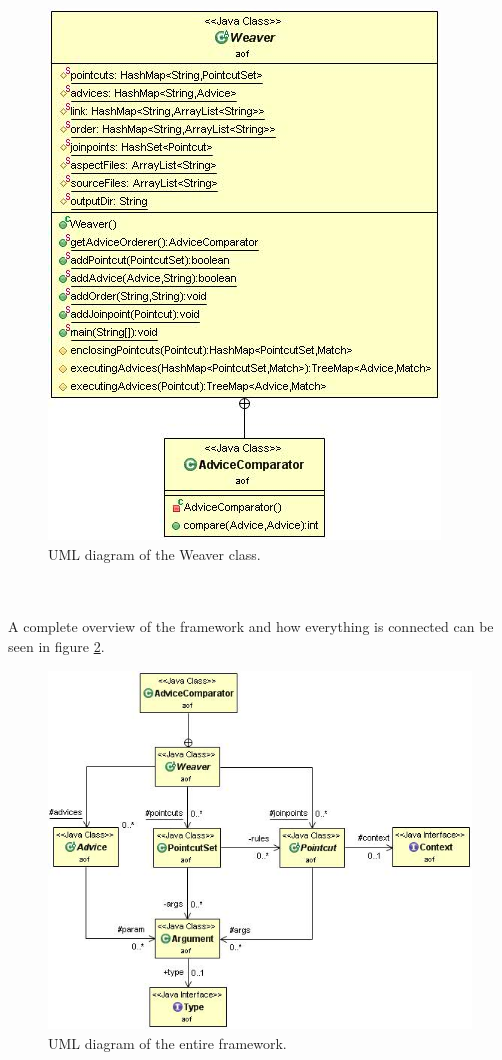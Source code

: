 \documentclass[a4paper]{report}
\begin{document}
\begin{figure}[h!]
\centering
\includegraphics[scale=0.7]{images/AOF/Weaver.jpg}
\caption{UML diagram of the Weaver class.}
\label{fig:Weaver}
\end{figure}\\
\\
A complete overview of the framework and how everything is connected can be seen in figure \ref{fig:FullView}.
\begin{figure}
\centering
\includegraphics[scale=0.65]{images/AOF/Full.jpg}
\caption{UML diagram of the entire framework.}
\label{fig:FullView}
\end{figure}
\end{document}
